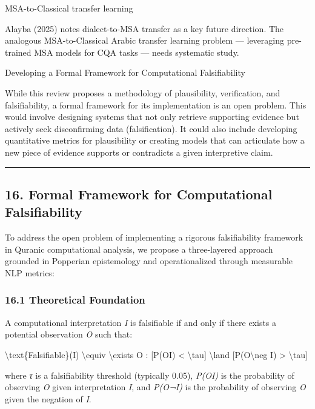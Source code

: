 \documentclass[12pt,a4paper]{article}
\begin{document}
MSA-to-Classical transfer learning

Alayba (2025) notes dialect-to-MSA transfer as a key future direction.
The analogous MSA-to-Classical Arabic transfer learning problem ---
leveraging pre-trained MSA models for CQA tasks --- needs systematic
study.

Developing a Formal Framework for Computational Falsifiability

While this review proposes a methodology of plausibility, verification,
and falsifiability, a formal framework for its implementation is an open
problem. This would involve designing systems that not only retrieve
supporting evidence but actively seek disconfirming data
(falsification). It could also include developing quantitative metrics
for plausibility or creating models that can articulate how a new piece
of evidence supports or contradicts a given interpretive claim.

\begin{center}\rule{0.5\linewidth}{0.5pt}\end{center}

\protect{}\label{s16}
\subsection{16. Formal Framework for Computational
Falsifiability}\label{formal-framework-for-computational-falsifiability}

To address the open problem of implementing a rigorous falsifiability
framework in Quranic computational analysis, we propose a three-layered
approach grounded in Popperian epistemology and operationalized through
measurable NLP metrics:

\subsubsection{16.1 Theoretical
Foundation}\label{theoretical-foundation}

A computational interpretation \emph{I} is falsifiable if and only if
there exists a potential observation \emph{O} such that:

\textbackslash text\{Falsifiable\}(I) \textbackslash equiv
\textbackslash exists O : {[}P(O\textbar I) \textless{}
\textbackslash tau{]} \textbackslash land
{[}P(O\textbar\textbackslash neg I) \textgreater{} \textbackslash tau{]}

where \emph{τ} is a falsifiability threshold (typically 0.05),
\emph{P(O\textbar I)} is the probability of observing \emph{O} given
interpretation \emph{I}, and \emph{P(O\textbar¬I)} is the probability of
observing \emph{O} given the negation of \emph{I}.
\end{document}
